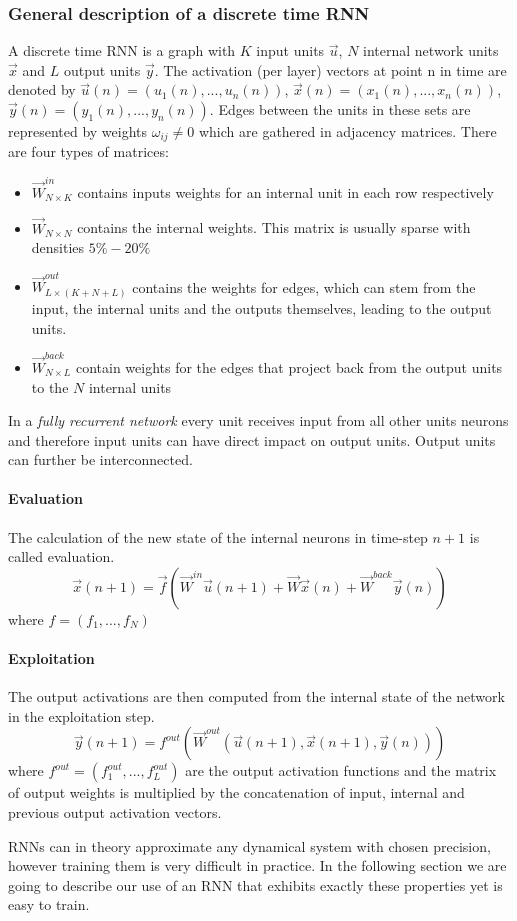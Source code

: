 \subsubsection*{General description of a discrete time RNN}
A discrete time RNN is a graph with $K$ input units $\vec{u}$, $N$ internal network units $\vec{x}$ and $L$ output units $\vec{y}$. The activation (per layer) vectors at point n in time are denoted by $\vec{u}(n) = (u_1(n),...,u_n(n))$, $\vec{x}(n) = (x_1(n),...,x_n(n))$, $\vec{y}(n) = (y_1(n),...,y_n(n))$. Edges between the units in these sets are represented by weights $\omega_{ij}\neq0$ which are gathered in adjacency matrices. There are four types of matrices:\par
\begin{itemize}
	\item $\vec{W}^{in}_{N\times K}$ contains inputs weights for an internal unit in each row respectively
	\item $\vec{W}_{N\times N}$ contains the internal weights. This matrix is usually sparse with densities $5\%-20\%$
	\item $\vec{W}^{out}_{L\times (K+N+L)}$ contains the weights for edges, which can stem from the input, the internal units and the outputs themselves, leading to the output units.
	\item $\vec{W}^{back}_{N\times L}$ contain weights for the edges that project back from the output units to the $N$ internal units
\end{itemize}

In a \emph{fully recurrent network} every unit receives input from all other units neurons and therefore input units can have direct impact on output units. Output units can further be interconnected.\par

\paragraph{Evaluation}
The calculation of the new state of the internal neurons in time-step $n+1$ is called evaluation.
\[
\vec{x}(n+1)=\vec{f}(\vec{W}^{in}\vec{u}(n+1)+\vec{W}\vec{x}(n)+\vec{W}^{back}\vec{y}(n))
\]
where $f=(f_1,...,f_N)$
\paragraph{Exploitation}
The output activations are then computed from the internal state of the network in the exploitation step.
\[
\vec{y}(n+1)=f^{out}(\vec{W}^{out}(\vec{u}(n+1),\vec{x}(n+1),\vec{y}(n)))
\]
where $f^{out}=(f^{out}_1,...,f^{out}_L)$ are the output activation functions and the matrix of output weights is multiplied by the concatenation of input, internal and previous output activation vectors.\par
RNNs can in theory approximate any dynamical system with chosen precision, however training them is very difficult in practice. In the following section we are going to describe our use of an RNN that exhibits exactly these properties yet is easy to train.

